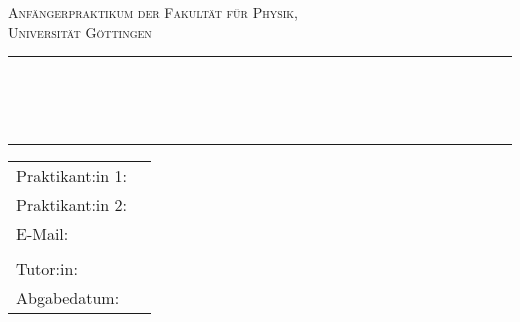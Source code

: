 

\begin{titlepage}
    \centering
    \textsc{\Large Anfängerpraktikum der Fakultät für
    Physik,\\[1.5ex] Universität Göttingen}

    \vspace*{4.2cm}

    \rule{\textwidth}{1pt}\\[0.5cm]
    {\huge \bfseries
    \EXPNUMBER{}\\[1.5ex]
    \EXPNAME{}}\\[0.5cm]
    \rule{\textwidth}{1pt}

    \vspace*{2.7cm}

    \begin{Large}
    \begin{tabular}{ll}
        Praktikant:in 1: & \FIRSTNAME{}\\
        Praktikant:in 2: & \SECONDNAME{}\\
        E-Mail: & \FIRSTEMAIL{} \\
                & \SECONDEMAIL{} \\
        Tutor:in: & \TUTOR{}\\
        Abgabedatum: & \DATE{} \\ 
    \end{tabular}
    \end{Large}

    \vspace*{0.8cm}
    
    \begin{Large}
    \end{Large}

\end{titlepage}

